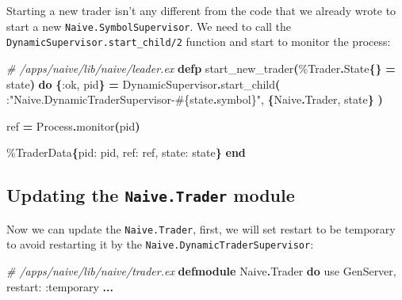 \documentclass[
  oneside]{book}
\newenvironment{Shaded}{\begin{snugshade}}{\end{snugshade}}
\newcommand{\CommentTok}[1]{\textcolor[rgb]{0.56,0.35,0.01}{\textit{#1}}}
\newcommand{\ConstantTok}[1]{\textcolor[rgb]{0.56,0.35,0.01}{#1}}
\newcommand{\FunctionTok}[1]{\textcolor[rgb]{0.13,0.29,0.53}{\textbf{#1}}}
\newcommand{\ImportTok}[1]{#1}
\newcommand{\KeywordTok}[1]{\textcolor[rgb]{0.13,0.29,0.53}{\textbf{#1}}}
\newcommand{\NormalTok}[1]{#1}
\newcommand{\OperatorTok}[1]{\textcolor[rgb]{0.81,0.36,0.00}{\textbf{#1}}}
\newcommand{\OtherTok}[1]{\textcolor[rgb]{0.56,0.35,0.01}{#1}}
\newcommand{\StringTok}[1]{\textcolor[rgb]{0.31,0.60,0.02}{#1}}
\newcommand{\VariableTok}[1]{\textcolor[rgb]{0.00,0.00,0.00}{#1}}
\begin{document}
Starting a new trader isn't any different from the code that we already wrote to start a new \texttt{Naive.SymbolSupervisor}. We need to call the \texttt{DynamicSupervisor.start\_child/2} function and start to monitor the process:

\begin{Shaded}
\begin{Highlighting}[]
  \CommentTok{\# /apps/naive/lib/naive/leader.ex}
  \KeywordTok{defp}\NormalTok{ start\_new\_trader}\FunctionTok{(}\NormalTok{\%}\ConstantTok{Trader}\OperatorTok{.}\ConstantTok{State}\FunctionTok{\{\}} \OperatorTok{=}\NormalTok{ state}\FunctionTok{)} \KeywordTok{do}
    \FunctionTok{\{}\VariableTok{:ok}\NormalTok{, pid}\FunctionTok{\}} \OperatorTok{=}
      \ConstantTok{DynamicSupervisor}\OperatorTok{.}\NormalTok{start\_child}\FunctionTok{(}
\NormalTok{        :}\StringTok{"Naive.DynamicTraderSupervisor{-}}\OtherTok{\#\{}\NormalTok{state}\OperatorTok{.}\NormalTok{symbol}\OtherTok{\}}\StringTok{"}\NormalTok{,}
        \FunctionTok{\{}\ConstantTok{Naive}\OperatorTok{.}\ConstantTok{Trader}\NormalTok{, state}\FunctionTok{\}}
      \FunctionTok{)}

\NormalTok{    ref }\OperatorTok{=} \ConstantTok{Process}\OperatorTok{.}\NormalTok{monitor}\FunctionTok{(}\NormalTok{pid}\FunctionTok{)}

\NormalTok{    \%}\ConstantTok{TraderData}\FunctionTok{\{}\VariableTok{pid:}\NormalTok{ pid, }\VariableTok{ref:}\NormalTok{ ref, }\VariableTok{state:}\NormalTok{ state}\FunctionTok{\}}
  \KeywordTok{end}
\end{Highlighting}
\end{Shaded}

\subsection{\texorpdfstring{Updating the \texttt{Naive.Trader} module}{Updating the Naive.Trader module}}\label{updating-the-naive.trader-module}

Now we can update the \texttt{Naive.Trader}, first, we will set restart to be temporary to avoid restarting it by the \texttt{Naive.DynamicTraderSupervisor}:

\begin{Shaded}
\begin{Highlighting}[]
\CommentTok{\# /apps/naive/lib/naive/trader.ex}
\KeywordTok{defmodule} \ConstantTok{Naive}\OperatorTok{.}\ConstantTok{Trader} \KeywordTok{do}
  \ImportTok{use} \ConstantTok{GenServer}\NormalTok{, }\VariableTok{restart:} \VariableTok{:temporary}
  \OperatorTok{...}
\end{Highlighting}
\end{Shaded}
\end{document}
